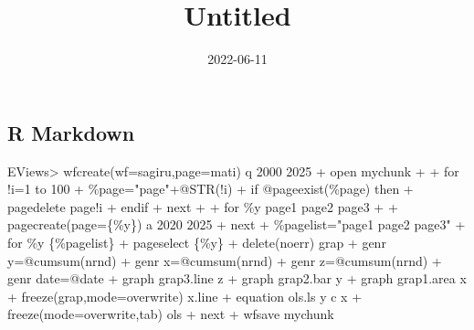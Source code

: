 \documentclass[
]{article}
\title{Untitled}
\author{}
\date{\vspace{-2.5em}2022-06-11}
\newenvironment{Shaded}{\begin{snugshade}}{\end{snugshade}}
\newcommand{\FunctionTok}[1]{\textcolor[rgb]{0.00,0.00,0.00}{#1}}
\newcommand{\NormalTok}[1]{#1}
\newcommand{\SpecialCharTok}[1]{\textcolor[rgb]{0.00,0.00,0.00}{#1}}
\begin{document}
\maketitle

{
\setcounter{tocdepth}{2}
\tableofcontents
}
\hypertarget{r-markdown}{%
\subsection{R Markdown}\label{r-markdown}}

\begin{Shaded}
\begin{Highlighting}[]
\NormalTok{EViews\textgreater{} wfcreate(wf=sagiru,page=mati) q 2000 2025}
\NormalTok{+ \textquotesingle{}open mychunk}
\NormalTok{+ }
\NormalTok{+ for !i=1 to 100}
\NormalTok{+ \%page="page"+@STR(!i)}
\NormalTok{+ if @pageexist(\%page) then}
\NormalTok{+ pagedelete page!i}
\NormalTok{+ endif}
\NormalTok{+ next}
\NormalTok{+ }
\NormalTok{+ for \%y page1 page2 page3  }
\NormalTok{+ }
\NormalTok{+ pagecreate(page=\{\%y\}) a 2020 2025}
\NormalTok{+ next}
\NormalTok{+ \%pagelist="page1 page2 page3"}
\NormalTok{+ for \%y \{\%pagelist\}}
\NormalTok{+ pageselect \{\%y\}}
\NormalTok{+ delete(noerr) grap}
\NormalTok{+ genr y=@cumsum(nrnd)}
\NormalTok{+ genr x=@cumsum(nrnd)}
\NormalTok{+ genr z=@cumsum(nrnd)}
\NormalTok{+ genr date=@date}
\NormalTok{+   graph grap3.line z   }
\NormalTok{+               graph grap2.bar y }
\NormalTok{+                           graph grap1.area x  }
\NormalTok{+    freeze(grap,mode=overwrite) x.line}
\NormalTok{+ equation ols.ls y c x}
\NormalTok{+ freeze(mode=overwrite,tab) ols}
\NormalTok{+ next}
\NormalTok{+ \textquotesingle{}wfsave mychunk}
\end{Highlighting}
\end{Shaded}

\begin{Shaded}
\end{Shaded}
\end{document}
